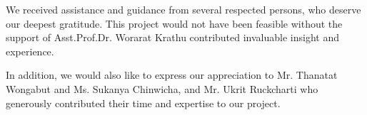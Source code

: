 \begin{acknowledgements}
We received assistance and guidance from several respected persons, who deserve our deepest
gratitude. This project would not have been feasible without the support of Asst.Prof.Dr. Worarat
Krathu contributed invaluable insight and experience.
\par
\vspace{0.5cm}
In addition, we would also like to express our appreciation to Mr. Thanatat Wongabut and Ms.
Sukanya Chinwicha, and Mr. Ukrit Ruckcharti who generously contributed their time and
expertise to our project.
\end{acknowledgements}